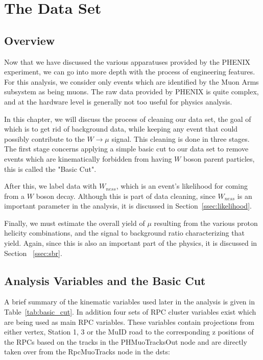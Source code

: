 \chapter{The Data Set}
\label{ch:data_collection}
\section{Overview}
Now that we have discussed the various apparatuses provided by the PHENIX
experiment, we can go into more depth with the process of engineering features.
For this analysis, we consider only events which are identified by the Muon Arms
subsystem as being muons. The raw data provided by PHENIX is quite complex, and
at the hardware level is generally not too useful for physics analysis.

In this chapter, we will discuss the process of cleaning our data set, the goal
of which is to get rid of background data, while keeping any event that could
possibly contribute to the $W\rightarrow\mu$ signal. This cleaning is done in
three stages. The first stage concerns applying a simple basic cut to our data
set to remove events which are kinematically forbidden from having $W$ boson
parent particles, this is called the "Basic Cut".

After this, we label data with $W_{ness}$, which is an event's likelihood for
coming from a $W$ boson decay. Although this is part of data cleaning, since
$W_{ness}$ is an important parameter in the analysis, it is discussed in
Section~\ref{ssec:likelihood}.

Finally, we must estimate the overall yield of $\mu$ resulting from the various
proton helicity combinations, and the signal to background ratio characterizing
that yield. Again, since this is also an important part of the physics, it is
discussed in Section ~\ref{ssec:sbr}.

\section{Analysis Variables and the Basic Cut}

A brief summary of the kinematic variables used later in the analysis is given
in Table~\ref{tab:basic_cut}. In addition four sets of RPC cluster variables exist
which are being used as main RPC variables. These variables contain
projections from either vertex, Station 1, 3 or the MuID road to the
corresponding z positions of the RPCs based on the tracks in the PHMuoTracksOut
node and are directly taken over from the RpcMuoTracks node in the dsts:

